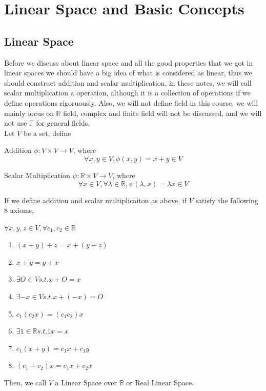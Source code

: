 \chapter{Linear Space and Basic Concepts}

\section{Linear Space}

Before we discuss about linear space and all the good properties that we got in linear spaces
we should have a big idea of what is considered as linear, thus we should construct addition and scalar multiplication,
in these notes, we will call scalar multiplication a operation, although it is a collection of operations if we define operations rigoruously.
Also, we will not define field in this course, we will mainly focus on $\mathbb{R}$ field, complex and finite field will not be discussed, and we will not use $\mathbb{F}$ for general fields. \\ 
Let $V$ be a set, define
\begin{definition}{Addition}
 $\phi:V \times V\to V $, where 
  $$\forall x,y \in V, \phi(x,y) = x + y \in V$$
\end{definition} 

\begin{definition}{Scalar Multiplication}
  $\psi:\mathbb{R} \times V \to V$, where
  \[\forall x \in V, \forall \lambda \in \mathbb{R}, \psi(\lambda,x) = \lambda x \in V\]
\end{definition}
If we define addition and scalar multiplicaiton as above, if $V$ satisfy the following 8 axioms,
\begin{axiom}
  $\forall x,y,z \in V, \forall c_{1},c_{2} \in \mathbb{R}$

  \begin{enumerate}
    [label=(\arabic*)]
      \item $(x + y) + z = x + (y + z)$
      \item $x + y = y + x$
      \item $\exists O \in V s.t. x + O = x$
      \item $\exists -x \in V s.t. x + (-x) = O$
      \item $c_{1}(c_{2}x) = (c_{1}c_{2})x$
      \item $\exists 1 \in \mathbb{R} s.t. 1x = x $
      \item $c_{1}(x+y) = c_{1}x + c_{1}y$
      \item $(c_{1}+c_{2})x = c_{1}x+c_{2}x$

  \end{enumerate}
\end{axiom}
Then, we call $V$ a Linear Space over $\mathbb{R}$ or Real Linear Space.

